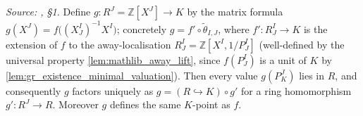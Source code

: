 \begin{lemma}\leanok
  \label{lem:gr_existence_factor_through_valuation_ring}
  \textit{Source: \cite{nitsure-hilbert-quot}, \S 1.}
  Define \(g : R^J = \mathbb{Z}[X^J] \to K\) by the matrix formula \(g(X^J) =
  f\bigl((X^I_J)^{-1} X^I\bigr)\); concretely \(g = f' \circ \tilde\theta_{I,J}\),
  where \(f' : R^I_J \to K\) is the extension of \(f\) to the away-localisation
  \(R^I_J = \mathbb{Z}[X^I, 1/P^I_J]\) (well-defined by the universal property
  \cref{lem:mathlib_away_lift}, since \(f(P^I_J)\) is a unit of \(K\) by
  \cref{lem:gr_existence_minimal_valuation}). Then every value \(g(P^J_K)\) lies in
  \(R\), and consequently \(g\) factors uniquely as \(g = (R \hookrightarrow K)
  \circ g'\) for a ring homomorphism \(g' : R^J \to R\). Moreover \(g\) defines the
  same \(K\)-point as \(f\).
\end{lemma}

